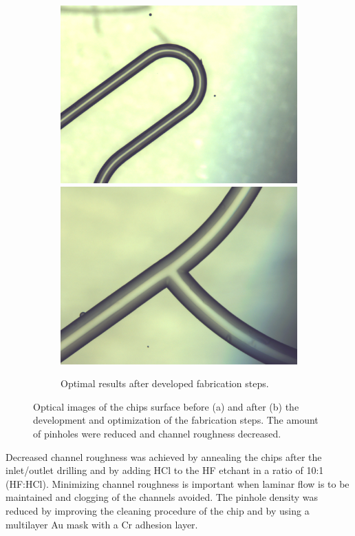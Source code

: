 \documentclass[final]{jyflluk}
\begin{document}
\begin{figure}[!h]
    \begin{subfigure}{1.0\textwidth}
        \includegraphics[width=.48\linewidth]{optical/good1.png}\quad\includegraphics[width=.48\linewidth]{optical/good2.png}
        \qquad
        \caption{Optimal results after developed fabrication steps.} \label{fig:bad0}
    \end{subfigure}

    \caption{Optical images of the chips surface before (a) and after (b) the development and optimization of the fabrication steps. The amount of pinholes were reduced and channel roughness decreased.} \label{fig:godbad}
\end{figure}  
\vaali

Decreased channel roughness was achieved by annealing the chips after the inlet/outlet drilling and by adding HCl to the HF etchant in a ratio of 10:1 (HF:HCl). Minimizing channel roughness is important when laminar flow is to be maintained and clogging of the channels avoided. The pinhole density was reduced by improving the cleaning procedure of the chip and by using a multilayer Au mask with a Cr adhesion layer. 
\end{document}
